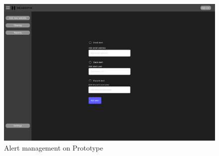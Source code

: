 \begin{figure}
    \centering
    \includegraphics[width=0.75\linewidth]{figures/prototype/prototype_alertpage.png}
    \caption{Alert management on Prototype}
    \label{fig:app_prototype_alert}
\end{figure}